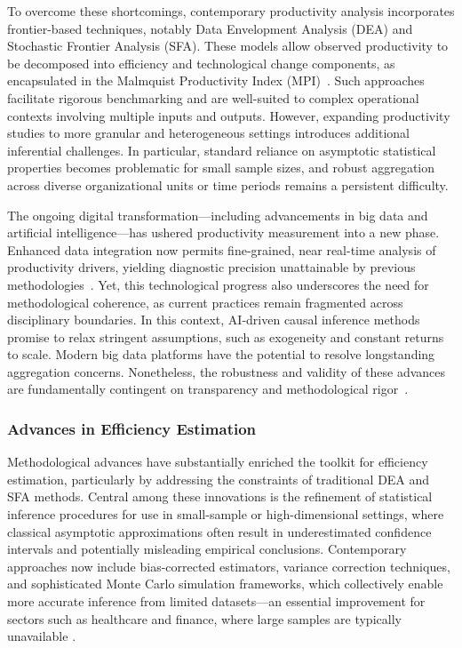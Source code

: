 \documentclass[sigconf]{acmart}
\begin{document}
To overcome these shortcomings, contemporary productivity analysis incorporates frontier-based techniques, notably Data Envelopment Analysis (DEA) and Stochastic Frontier Analysis (SFA). These models allow observed productivity to be decomposed into efficiency and technological change components, as encapsulated in the Malmquist Productivity Index (MPI)~\cite{ref86}. Such approaches facilitate rigorous benchmarking and are well-suited to complex operational contexts involving multiple inputs and outputs. However, expanding productivity studies to more granular and heterogeneous settings introduces additional inferential challenges. In particular, standard reliance on asymptotic statistical properties becomes problematic for small sample sizes, and robust aggregation across diverse organizational units or time periods remains a persistent difficulty.

The ongoing digital transformation—including advancements in big data and artificial intelligence—has ushered productivity measurement into a new phase. Enhanced data integration now permits fine-grained, near real-time analysis of productivity drivers, yielding diagnostic precision unattainable by previous methodologies~\cite{ref86}. Yet, this technological progress also underscores the need for methodological coherence, as current practices remain fragmented across disciplinary boundaries. In this context, AI-driven causal inference methods promise to relax stringent assumptions, such as exogeneity and constant returns to scale. Modern big data platforms have the potential to resolve longstanding aggregation concerns. Nonetheless, the robustness and validity of these advances are fundamentally contingent on transparency and methodological rigor~\cite{ref86}.

\subsubsection{Advances in Efficiency Estimation}

Methodological advances have substantially enriched the toolkit for efficiency estimation, particularly by addressing the constraints of traditional DEA and SFA methods. Central among these innovations is the refinement of statistical inference procedures for use in small-sample or high-dimensional settings, where classical asymptotic approximations often result in underestimated confidence intervals and potentially misleading empirical conclusions. Contemporary approaches now include bias-corrected estimators, variance correction techniques, and sophisticated Monte Carlo simulation frameworks, which collectively enable more accurate inference from limited datasets—an essential improvement for sectors such as healthcare and finance, where large samples are typically unavailable \cite{ref87}.
\end{document}
